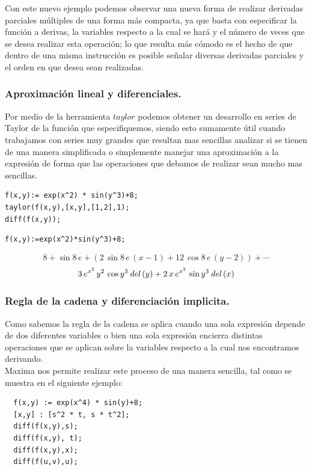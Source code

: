 \documentclass[12pt]{article}
\begin{document}
Con este nuevo ejemplo podemos observar una nueva forma de realizar derivadas parciales múltiples de una forma más compacta, ya que basta con especificar la función a derivas, la variables respecto a la cual se hará y el número de veces que se desea realizar esta operación; lo que resulta más cómodo es el hecho de que dentro de una misma instrucción es posible señalar diversas derivadas parciales y el orden en que desea sean realizadas.

\subsubsection*{Aproximación lineal y diferenciales.}

Por medio de la herramienta $taylor$ podemos obtener un desarrollo en series de Taylor de la función que especifiquemos, siendo esto sumamente útil cuando trabajamos con series muy grandes que resultan mas sencillas analizar si se tienen de una manera simplificada o simplemente manejar una aproximación a la expresión de forma que las operaciones que debamos de realizar sean mucho mas sencillas.
\begin{verbatim}
f(x,y):= exp(x^2) * sin(y^3)+8;
taylor(f(x,y),[x,y],[1,2],1);
diff(f(x,y));
\end{verbatim}

\begin{verbatim}
f(x,y):=exp(x^2)*sin(y^3)+8;
\end{verbatim}
$$8+\sin 8\,e+\left(2\,\sin 8\,e\,\left(x-1\right)+12\,\cos 8\,e\,
 \left(y-2\right)\right)+\cdots $$
 $$3\,e^{x^2}\,y^2\,\cos y^3\,{\it del}\left(y\right)+2\,x\,e^{x^2}\,
  \sin y^3\,{\it del}\left(x\right)$$
  
  \subsubsection*{Regla de la cadena y diferenciaci\'on implicita.}
  
  Como sabemos la regla de la cadena se aplica cuando una sola expresión depende de dos diferentes variables o bien una sola expresión encierra distintas operaciones que se aplican sobre la variables respecto a la cual nos encontramos derivando.\\
  
  Maxima nos permite realizar este proceso de una manera sencilla, tal como se muestra en el siguiente ejemplo:
  \begin{verbatim}
  f(x,y) := exp(x^4) * sin(y)+8;
  [x,y] : [s^2 * t, s * t^2];
  diff(f(x,y),s);
  diff(f(x,y), t);
  diff(f(x,y),x);
  diff(f(u,v),u);
  \end{verbatim}
  
\end{document}
